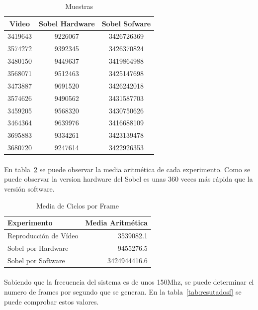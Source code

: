 \documentclass[a4paper,12pt,titlepage,final]{book}
\begin{document}
\begin{table}[hbtp]
\centering
\begin{tabular}{*{3}{c}}
Video   & Sobel Hardware & Sobel Sofware \\
\hline
3419643 &    9226067     &  3426726369   \\
3574272 &    9392345     &  3426370824   \\
3480150 &    9449637     &  3419864988   \\
3568071 &    9512463     &  3425147698   \\
3473887 &    9691520     &  3426242018   \\
3574626 &    9490562     &  3431587703   \\
3459205 &    9568320     &  3430750626   \\
3464364 &    9639976     &  3416688109   \\
3695883 &    9334261     &  3423139478   \\
3680720 &    9247614     &  3422926353   \\
\end{tabular}
\caption{Muestras}
\label{tab:Muestras}
\end{table}

\paragraph{}
En tabla~\ref{tab:resutadosc} se puede observar la media aritmética de cada experimento. Como se puede observar la version hardware del Sobel es unas 360 veces más rápida que la versión software.

\begin{table}[hbtp]
\centering
\begin{tabular}{l r}
Experimento            & Media Aritmética \\
\hline
Reproducción de Vídeo  &    3539082.1     \\
Sobel por Hardware     &    9455276.5     \\
Sobel por Software     &   3424944416.6   \\
\end{tabular}
\caption{Media de Ciclos por Frame}
\label{tab:resutadosc}
\end{table}

\paragraph{}
Sabiendo que la frecuencia del sistema es de unos 150Mhz, se puede determinar el numero de frames por segundo que se generan. En la tabla~\ref{tab:resutadosf} se puede comprobar estos valores.
\end{document}

